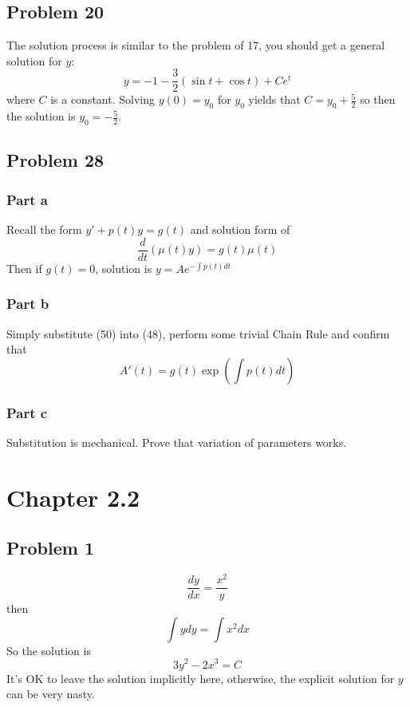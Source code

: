 \documentclass[12pt]{article}
\begin{document}
\subsection*{Problem 20}
\label{sec:orgd20a9f9}
The solution process is similar to the problem of 17, you should get a
general solution for \(y\):
\begin{equation*}
        y = -1 - \frac{3}{2}(\sin t + \cos t) + C e^t
\end{equation*}
where \(C\) is a constant. Solving \(y(0) = y_0\) for \(y_0\) yields that
\(C = y_0 + \frac{5}{2}\) so then the solution is \(y_0 = -\frac{5}{2}\).
\subsection*{Problem 28}
\label{sec:org1f75769}
\subsubsection*{Part a}
\label{sec:org2f1ef51}
Recall the form \(y' + p(t) y = g(t)\) and solution form of 
\begin{equation*}
        \frac{d}{dt}(\mu(t)y) = g(t) \mu(t)
\end{equation*}
Then if \(g(t)=0\), solution
is \(y = A e^{-\int{p(t)dt}}\)
\subsubsection*{Part b}
\label{sec:org6a08a95}
Simply substitute (50) into (48), perform some trivial Chain Rule and
confirm that
\begin{equation*}
        A'(t) = g(t) \exp\left(\int p(t) dt\right)
\end{equation*}
\subsubsection*{Part c}
\label{sec:org29ecbca}
Substitution is mechanical. Prove that variation of parameters works.
\section*{Chapter 2.2}
\label{sec:org56e17ed}
\subsection*{Problem 1}
\label{sec:org64eeefc}
\begin{equation*}
        \frac{dy}{dx} = \frac{x^2}{y}
\end{equation*}
then
\begin{equation*}
        \int y dy = \int x^2 dx
\end{equation*}
So the solution is
\begin{equation*}
        3y^2-2x^3=C
\end{equation*}
It's OK to leave the solution implicitly here, otherwise, the explicit
solution for \(y\) can be very nasty.
\end{document}
